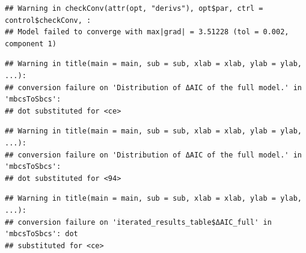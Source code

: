 \documentclass[
]{article}
\newenvironment{Shaded}{\begin{snugshade}}{\end{snugshade}}
\newcommand{\AttributeTok}[1]{\textcolor[rgb]{0.77,0.63,0.00}{#1}}
\newcommand{\CommentTok}[1]{\textcolor[rgb]{0.56,0.35,0.01}{\textit{#1}}}
\newcommand{\FunctionTok}[1]{\textcolor[rgb]{0.00,0.00,0.00}{#1}}
\newcommand{\NormalTok}[1]{#1}
\newcommand{\OtherTok}[1]{\textcolor[rgb]{0.56,0.35,0.01}{#1}}
\newcommand{\SpecialCharTok}[1]{\textcolor[rgb]{0.00,0.00,0.00}{#1}}
\newcommand{\StringTok}[1]{\textcolor[rgb]{0.31,0.60,0.02}{#1}}
\begin{document}
\begin{Shaded}
\end{Shaded}

\begin{verbatim}
## Warning in checkConv(attr(opt, "derivs"), opt$par, ctrl = control$checkConv, :
## Model failed to converge with max|grad| = 3.51228 (tol = 0.002, component 1)
\end{verbatim}

\begin{Shaded}
\end{Shaded}

\begin{verbatim}
## Warning in title(main = main, sub = sub, xlab = xlab, ylab = ylab, ...):
## conversion failure on 'Distribution of ΔAIC of the full model.' in 'mbcsToSbcs':
## dot substituted for <ce>
\end{verbatim}

\begin{verbatim}
## Warning in title(main = main, sub = sub, xlab = xlab, ylab = ylab, ...):
## conversion failure on 'Distribution of ΔAIC of the full model.' in 'mbcsToSbcs':
## dot substituted for <94>
\end{verbatim}

\begin{verbatim}
## Warning in title(main = main, sub = sub, xlab = xlab, ylab = ylab, ...):
## conversion failure on 'iterated_results_table$ΔAIC_full' in 'mbcsToSbcs': dot
## substituted for <ce>
\end{verbatim}
\end{document}
